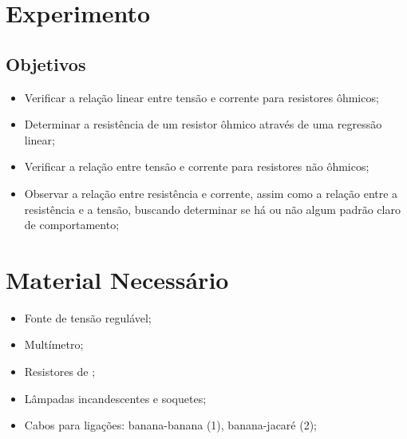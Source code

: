 
\section{Experimento}

\subsection{Objetivos}
\label{Sec:ObjetivosLeiDeOhm}

\begin{itemize}
	\item Verificar a relação linear entre tensão e corrente para resistores ôhmicos;
	\item Determinar a resistência de um resistor ôhmico através de uma regressão linear;
	\item Verificar a relação entre tensão e corrente para resistores não ôhmicos;
	\item Observar a relação entre resistência e corrente, assim como a relação entre a resistência e a tensão, buscando determinar se há ou não algum padrão claro de comportamento;
\end{itemize}

\section{Material Necessário}

\begin{itemize}
	\item Fonte de tensão regulável;
	\item Multímetro;
	\item Resistores de ;
	\item Lâmpadas incandescentes e soquetes; 
	\item Cabos para ligações: banana-banana (1), banana-jacaré (2);
\end{itemize}

